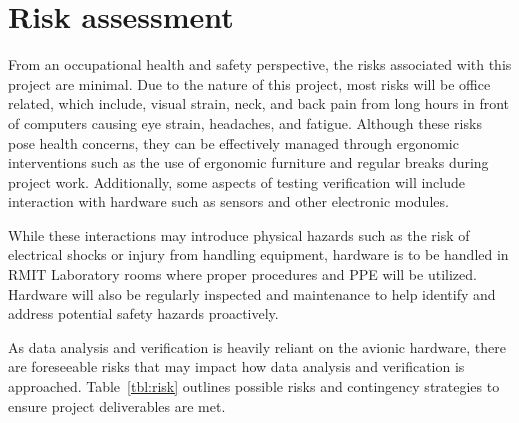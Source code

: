 \section{Risk assessment}
From an occupational health and safety perspective, the risks associated with this project are minimal. Due to the nature of this project, most risks will be office related, which include, visual strain, neck, and back pain from long hours in front of computers causing eye strain, headaches, and fatigue. Although these risks pose health concerns, they can be effectively managed through ergonomic interventions such as the use of ergonomic furniture and regular breaks during project work. Additionally, some aspects of testing verification will include interaction with hardware such as sensors and other electronic modules. 

While these interactions may introduce physical hazards such as the risk of electrical shocks or injury from handling equipment, hardware is to be handled in RMIT Laboratory rooms where proper procedures and PPE will be utilized. Hardware will also be regularly inspected and maintenance to help identify and address potential safety hazards proactively.  

As data analysis and verification is heavily reliant on the avionic hardware, there are foreseeable risks that may impact how data analysis and verification is approached. Table~\ref{tbl:risk} outlines possible risks and contingency strategies to ensure project deliverables are met.  

